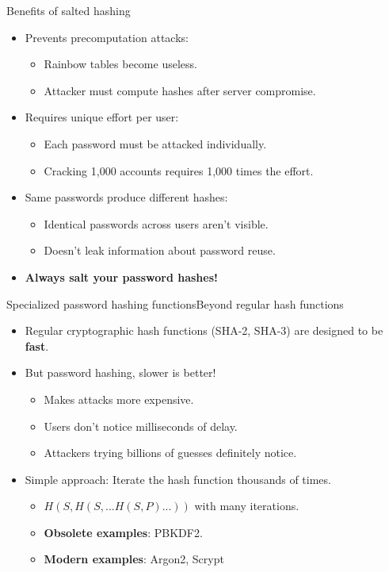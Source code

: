 \documentclass[aspectratio=169, lualatex, handout]{beamer}
\begin{document}
\begin{frame}{Benefits of salted hashing}
	\begin{itemize}
		\item Prevents precomputation attacks:
		      \begin{itemize}
			      \item Rainbow tables become useless.
			      \item Attacker must compute hashes after server compromise.
		      \end{itemize}
		\item Requires unique effort per user:
		      \begin{itemize}
			      \item Each password must be attacked individually.
			      \item Cracking 1,000 accounts requires 1,000 times the effort.
		      \end{itemize}
		\item Same passwords produce different hashes:
		      \begin{itemize}
			      \item Identical passwords across users aren't visible.
			      \item Doesn't leak information about password reuse.
		      \end{itemize}
		\item \textbf{Always salt your password hashes!}
	\end{itemize}
\end{frame}

\begin{frame}{Specialized password hashing functions}{Beyond regular hash functions}
	\begin{itemize}
		\item Regular cryptographic hash functions (SHA-2, SHA-3) are designed to be \textbf{fast}.
		\item But password hashing, slower is better!
		      \begin{itemize}
			      \item Makes attacks more expensive.
			      \item Users don't notice milliseconds of delay.
			      \item Attackers trying billions of guesses definitely notice.
		      \end{itemize}
		\item Simple approach: Iterate the hash function thousands of times.
		      \begin{itemize}
			      \item $H(S, H(S, ... H(S,P)...))$ with many iterations.
			      \item \textbf{Obsolete examples}: PBKDF2.
			      \item \textbf{Modern examples}: Argon2, Scrypt
		      \end{itemize}
	\end{itemize}
\end{frame}
\end{document}
